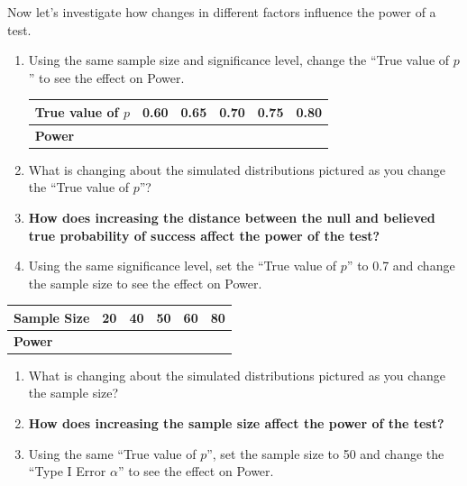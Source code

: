 \documentclass[
]{report}
\begin{document}
Now let's investigate how changes in different factors influence the power of a test.

\begin{enumerate}
\def\labelenumi{\arabic{enumi}.}
\setcounter{enumi}{9}
\item
  Using the same sample size and significance level, change the ``True value of \(p\)'' to see the effect on Power.
  \setlength\tabcolsep{0.5cm}

  \begin{longtable}{|l|c|c|c|c|c|}
  \hline
  \textbf{True value of $p$}& 0.60 & 0.65 & 0.70 & 0.75 & 0.80 \\ \hline
  \textbf{Power} & & & & &  \\ \hline
  \end{longtable}
\item
  What is changing about the simulated distributions pictured as you change the ``True value of \(p\)''?
  \vspace{0.5in}
\item
  \textbf{How does increasing the distance between the null and believed true probability of success affect the power of the test?}
  \vspace{0.5in}
\item
  Using the same significance level, set the ``True value of \(p\)'' to 0.7 and change the sample size to see the effect on Power.
\end{enumerate}

\setlength\tabcolsep{0.6cm}
\begin{longtable}{|l|c|c|c|c|c|}
\hline
\textbf{Sample Size}& 20 & 40 & 50 & 60 & 80 \\ \hline
\textbf{Power} & & & & &  \\ \hline
\end{longtable}

\begin{enumerate}
\def\labelenumi{\arabic{enumi}.}
\setcounter{enumi}{13}
\item
  What is changing about the simulated distributions pictured as you change the sample size?
  \vspace{0.5in}
\item
  \textbf{How does increasing the sample size affect the power of the test?}
  \vspace{0.5in}
\item
  Using the same ``True value of \(p\)'', set the sample size to 50 and change the ``Type I Error \(\alpha\)'' to see the effect on Power.
\end{enumerate}
\end{document}
